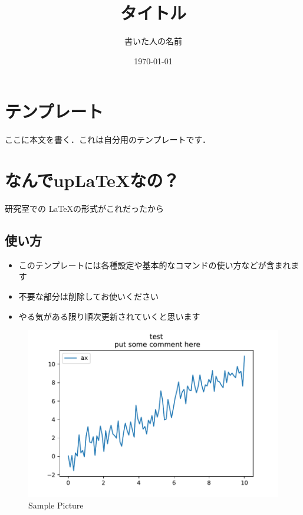 \documentclass[uplatex, a4paper]{jsarticle}
\title{\Huge タイトル}
\author{\huge 書いた人の名前}
\date{\today}
\begin{document}
\maketitle  %

\section{テンプレート}
ここに本文を書く．これは自分用のテンプレートです．

\section{なんでupLaTeXなの？}
研究室での \LaTeX の形式がこれだったから


\subsection{使い方}
\begin{itemize}
    \item このテンプレートには各種設定や基本的なコマンドの使い方などが含まれます
    \item 不要な部分は削除してお使いください
    \item やる気がある限り順次更新されていくと思います
\end{itemize}

\begin{figure}[h]   %
    \centering              %
    \includegraphics[width=60truemm,clip]{Images/graph_sample.pdf}
    \caption{Sample Picture}%
    \label{fig:sample}      %
\end{figure}
\end{document}
